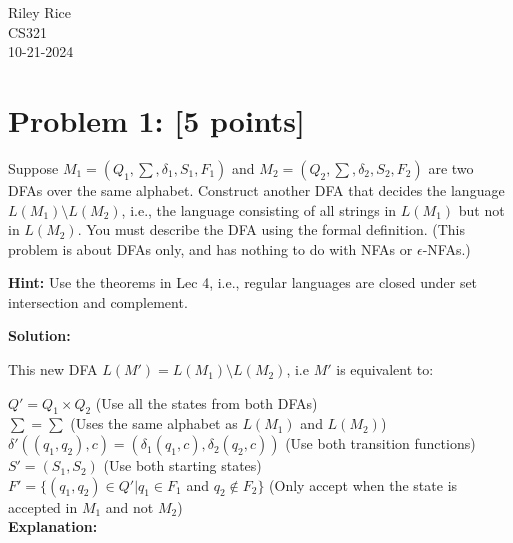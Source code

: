 \documentclass[11pt, letterpaper]{article}
\begin{document}
\noindent Riley Rice\\CS321\\10-21-2024

\begin{center}\end{center}

\section*{Problem 1: [5 points]}

Suppose $M_1 = (Q_1, \sum, \delta_1, S_1, F_1)$ and $M_2 = (Q_2, \sum, \delta_2, S_2, F_2)$ are two DFAs over the same alphabet. Construct another DFA that decides the language $L(M_1) \setminus  L(M_2)$, i.e., the language consisting of all strings in $L(M_1)$ but not in $L(M_2)$. You must describe the DFA using the formal definition. (This problem is about DFAs only, and has nothing to do with NFAs or $\epsilon$-NFAs.)

\vspace{5mm}

\noindent \textbf{Hint:} Use the theorems in Lec 4, i.e., regular languages are closed under set intersection and complement.

\vspace{5mm}

\noindent\textbf{Solution:}
 
\vspace {5mm}
 
\noindent This new DFA $L(M') = L(M_1) \setminus L(M_2)$, i.e $M'$ is equivalent to:
 
\vspace{5mm}
 
\noindent$Q' = Q_1 \times Q_2$ (Use all the states from both DFAs)\\
$\sum = \sum$ (Uses the same alphabet as $L(M_1)$ and $L(M_2)$)\\
$\delta'((q_1, q_2), c) = (\delta_1(q_1, c), \delta_2(q_2, c))$ (Use both transition functions)\\
$S' = (S_1, S_2)$ (Use both starting states)\\
$F' = \{(q_1, q_2) \in Q' |  q_1 \in F_1$ and $q_2 \notin F_2\}$ (Only accept when the state is accepted in $M_1$ and not $M_2$)\\

\noindent \textbf{Explanation:}

\vspace{5mm}
\end{document}
